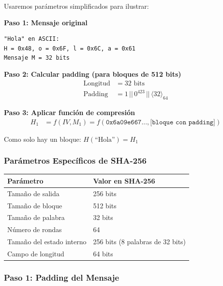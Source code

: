 \documentclass[11pt,a4paper,twoside,openright]{book}
\theoremstyle{definition}
\theoremstyle{plain}
\theoremstyle{remark}
\begin{document}
\begin{ejemplo}
Usaremos parámetros simplificados para ilustrar:

\textbf{Paso 1: Mensaje original}
\begin{verbatim}
"Hola" en ASCII:
H = 0x48, o = 0x6F, l = 0x6C, a = 0x61
Mensaje M = 32 bits
\end{verbatim}

\textbf{Paso 2: Calcular padding (para bloques de 512 bits)}
\begin{align}
\text{Longitud} &= 32 \text{ bits} \\
\text{Padding} &= 1 \,||\, 0^{423} \,||\, \langle 32 \rangle_{64}
\end{align}

\textbf{Paso 3: Aplicar función de compresión}
\begin{align}
H_1 &= f(IV, M_1) = f(\texttt{0x6a09e667...}, \texttt{[bloque con padding]})
\end{align}

Como solo hay un bloque: $H(\text{``Hola''}) = H_1$
\end{ejemplo}

\subsubsection{Parámetros Específicos de SHA-256}

\begin{center}
\begin{tabular}{ll}
\toprule
\textbf{Parámetro} & \textbf{Valor en SHA-256} \\
\midrule
Tamaño de salida & 256 bits \\
Tamaño de bloque & 512 bits \\
Tamaño de palabra & 32 bits \\
Número de rondas & 64 \\
Tamaño del estado interno & 256 bits (8 palabras de 32 bits) \\
Campo de longitud & 64 bits \\
\bottomrule
\end{tabular}
\end{center}

\subsubsection{Paso 1: Padding del Mensaje}
\end{document}
